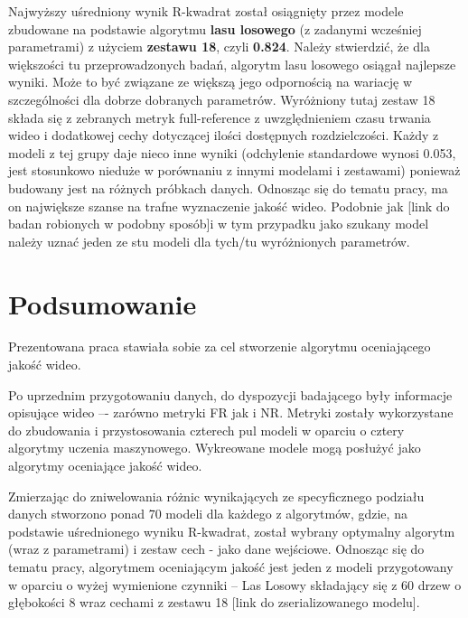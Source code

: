 Najwyższy uśredniony wynik R-kwadrat został osiągnięty przez modele zbudowane na podstawie algorytmu \textbf{lasu losowego} (z zadanymi wcześniej parametrami) z użyciem \textbf{zestawu 18}, czyli \textbf{0.824}. Należy stwierdzić, że dla większości tu przeprowadzonych badań, algorytm lasu losowego osiągał najlepsze wyniki.  Może to być związane ze większą jego odpornością na wariację  w szczególności dla dobrze dobranych parametrów. Wyróżniony tutaj zestaw 18 składa się z  zebranych metryk full-reference z uwzględnieniem czasu trwania wideo i dodatkowej cechy dotyczącej ilości dostępnych rozdzielczości. Każdy z modeli z tej grupy daje nieco inne  wyniki (odchylenie standardowe wynosi 0.053, jest stosunkowo nieduże w porównaniu z innymi modelami i zestawami) ponieważ budowany jest na różnych próbkach danych.  Odnosząc się do tematu pracy, ma on największe szanse na trafne wyznaczenie jakość wideo. Podobnie jak [link do badan robionych w podobny sposób]i w tym przypadku jako szukany model należy uznać jeden ze stu modeli dla tych/tu wyróżnionych parametrów. 



\chapter{Podsumowanie}



Prezentowana praca stawiała sobie za cel stworzenie algorytmu oceniającego jakość wideo.

Po uprzednim przygotowaniu danych, do dyspozycji badającego były informacje opisujące wideo –- zarówno metryki FR jak i NR. Metryki zostały wykorzystane do zbudowania i przystosowania czterech pul modeli w oparciu o  cztery algorytmy uczenia maszynowego. Wykreowane modele mogą posłużyć jako algorytmy oceniające jakość wideo.

Zmierzając do zniwelowania różnic wynikających ze specyficznego podziału danych stworzono ponad 70 modeli dla każdego z algorytmów, gdzie, na podstawie uśrednionego wyniku R-kwadrat, został wybrany optymalny algorytm (wraz z parametrami) i zestaw cech - jako dane wejściowe. Odnosząc się do tematu pracy, algorytmem oceniającym jakość jest jeden z modeli przygotowany w oparciu o wyżej wymienione czynniki -- Las Losowy składający się z 60 drzew o głębokości 8 wraz cechami z zestawu 18 [link do zserializowanego modelu].

